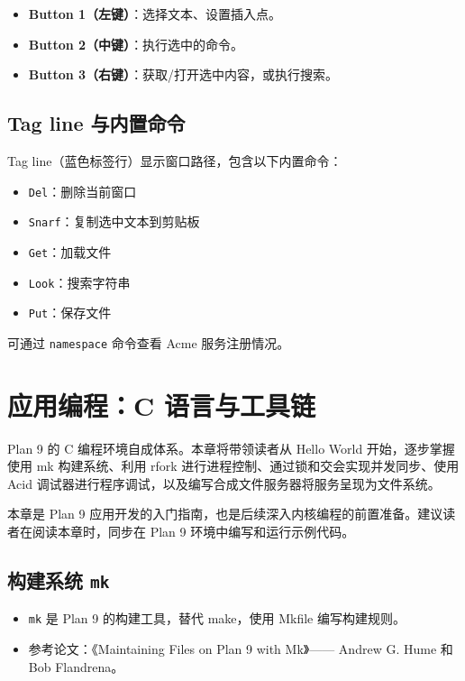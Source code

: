 \documentclass[12pt,UTF8]{ctexbook}
\begin{document}
\begin{itemize}
\item \textbf{Button 1（左键）}：选择文本、设置插入点。
\item \textbf{Button 2（中键）}：执行选中的命令。
\item \textbf{Button 3（右键）}：获取/打开选中内容，或执行搜索。
\end{itemize}
	
\section{Tag line 与内置命令}

Tag line（蓝色标签行）显示窗口路径，包含以下内置命令：

\begin{itemize}
\item \texttt{Del}：删除当前窗口
\item \texttt{Snarf}：复制选中文本到剪贴板
\item \texttt{Get}：加载文件
\item \texttt{Look}：搜索字符串
\item \texttt{Put}：保存文件
\end{itemize}

可通过 \texttt{namespace} 命令查看 Acme 服务注册情况。
	
\chapter{应用编程：C 语言与工具链}

Plan 9 的 C 编程环境自成体系。本章将带领读者从 Hello World 开始，逐步掌握使用 mk 构建系统、利用 rfork 进行进程控制、通过锁和交会实现并发同步、使用 Acid 调试器进行程序调试，以及编写合成文件服务器将服务呈现为文件系统。

本章是 Plan 9 应用开发的入门指南，也是后续深入内核编程的前置准备。建议读者在阅读本章时，同步在 Plan 9 环境中编写和运行示例代码。

\section{构建系统 \texttt{mk}}

\begin{itemize}
\item \texttt{mk} 是 Plan 9 的构建工具，替代 make，使用 Mkfile 编写构建规则。
\item 参考论文：《Maintaining Files on Plan 9 with Mk》—— Andrew G. Hume 和 Bob Flandrena。
\end{itemize}
\end{document}
